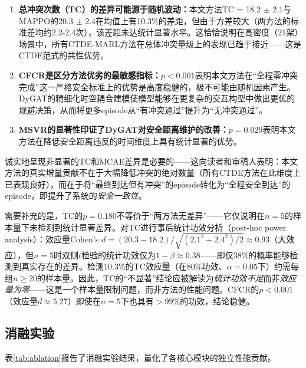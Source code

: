 \documentclass[12pt,a4paper,UTF8]{ctexart}
\begin{document}
\begin{enumerate}[label=(\arabic*)]
    \item \textbf{总冲突次数（TC）的差异可能源于随机波动：}本文方法TC = 18.2 $\pm$ 2.1与MAPPO的20.3 $\pm$ 2.4在均值上有10.3\%的差距，但由于方差较大（两方法的标准差均约2.2-2.4次），该差距未达统计显著水平。这恰恰说明在高密度（21架）场景中，所有CTDE-MARL方法在总体冲突量级上的表现已趋于接近——这是CTDE范式的共性优势。
    \item \textbf{CFCR是区分方法优劣的最敏感指标：}$p<0.001$表明本文方法在``全程零冲突完成''这一严格安全标准上的优势是高度稳健的，极不可能由随机因素产生。DyGAT的精细化时空耦合建模使模型能够在更复杂的交互构型中做出更优的规避决策，从而将更多episode从``有冲突通过''提升为``无冲突通过''。
    \item \textbf{MSVR的显著性印证了DyGAT对安全距离维护的改善：}$p=0.029$表明本文方法在降低安全距离违反的时间维度上具有统计显著的优势。
\end{enumerate}

诚实地呈现非显著的TC和MCAE差异是必要的——这向读者和审稿人表明：本文方法的真实增量贡献不在于大幅降低冲突的绝对数量（所有CTDE方法在此维度上已表现良好），而在于将``最终到达但有冲突''的episode转化为``全程安全到达''的episode，即提升了系统的\emph{安全一致性}。

需要补充的是，TC的$p=0.180$不等价于``两方法无差异''——它仅说明在$n=5$的样本量下未检测到统计显著差异。对TC进行事后统计功效分析（post-hoc power analysis）：效应量Cohen's $d = (20.3-18.2)/\sqrt{(2.1^2+2.4^2)/2} \approx 0.93$（大效应），但$n=5$时双侧$t$检验的统计功效仅为$1-\beta \approx 0.38$——即仅38\%的概率能够检测到真实存在的差异。检测10.3\%的TC效应量（在80\%功效、$\alpha=0.05$下）约需每组$n \geq 20$的样本量。因此，TC的``不显著''结论应被解读为\emph{统计功效不足}而非\emph{效应量为零}——这是一个样本量限制问题，而非方法的性能问题。CFCR的$p<0.001$（效应量$d \approx 5.27$）即使在$n=5$下也具有$>99\%$的功效，结论稳健。

\subsection{消融实验}

表\ref{tab:ablation}报告了消融实验结果，量化了各核心模块的独立性能贡献。
\end{document}
